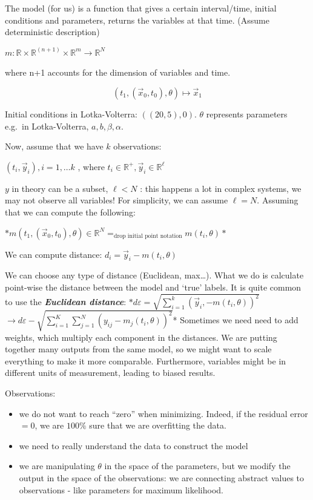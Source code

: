 The model (for us) is a function that gives a certain interval/time,
initial conditions and parameters, returns the variables at that time.
(Assume deterministic description)

$m: \mathbb{R} \times \mathbb{R}^{(n+1)} \times \mathbb{R}^m \rightarrow \mathbb{R}^N$

where n+1 accounts for the dimension of variables and time.

$$
\left(t_1,\left(\vec{x}_0, t_0\right), \theta\right)
\longmapsto \vec{x}_1 $$

Initial conditions in Lotka-Volterra: $((20,5), 0)$. $\theta$ represents
parameters e.g.~in Lotka-Volterra, $a,b,\beta,\alpha$.

Now, assume that we have $k$ observations:

$(t_i ,\vec{y}_i), i=1, \ldots k$ , where
$t_i \in \mathbb{R}^+, \vec{y}_i \in \mathbb{R}^\ell$

$y$ in theory can be a subset, $\ell<N$ : this happens a lot in complex
systems, we may not observe all variables! For simplicity, we can assume
$\ell=N$. Assuming that we can compute the following:

$*m\left(t_1,\left(\vec{x}_0, t_0\right), \theta\right) \in \mathbb{R}^{N} =_{\text{drop initial point notation}} m(t_i,\theta)*$

We can compute distance: \emph{$d_i=\vec{y}_i-m(t_i, \theta)$}

We can choose any type of distance (Euclidean, max\ldots). What we do is
calculate point-wise the distance between the model and `true' labels.
It is quite common to use the \textbf{\emph{Euclidean distance}}:
$*d \varepsilon =\sqrt{\sum_{i=1}^k(\vec{y}_i,-m(t_i, \theta))^2}$
$\rightarrow d{\varepsilon}-\sqrt{\sum_{i=1}^{K} \sum_{j=1}^{N} \left(y_{ij}-m_j\left(t_i, \theta\right)\right)^2}$*
Sometimes we need need to add weights, which multiply each component in
the distances. We are putting together many outputs from the same model,
so we might want to scale everything to make it more comparable.
Furthermore, variables might be in different units of measurement,
leading to biased results.

Observations:

\begin{itemize}
\tightlist
\item
  we do not want to reach ``zero'' when minimizing. Indeed, if the
  residual error $=0$, we are $100 \%$ sure that we are overfitting the
  data.
\item
  we need to really understand the data to construct the model
\item
  we are manipulating $\theta$ in the space of the parameters, but we
  modify the output in the space of the observations: we are connecting
  abstract values to observations - like parameters for maximum
  likelihood.
\end{itemize}

